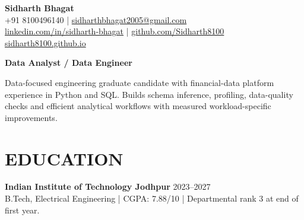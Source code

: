 \documentclass[10pt,a4paper]{article}
\begin{document}
\fontsize{9}{12.2}\selectfont
\begin{center}
{\fontsize{23}{26}\selectfont\bfseries Sidharth Bhagat}\\[4pt]
+91 8100496140 | \href{mailto:sidharthbhagat2005@gmail.com}{sidharthbhagat2005@gmail.com}\\
\href{https://www.linkedin.com/in/sidharth-bhagat/}{linkedin.com/in/sidharth-bhagat} | \href{https://github.com/Sidharth8100}{github.com/Sidharth8100}\\
\href{https://sidharth8100.github.io}{sidharth8100.github.io}
\end{center}
\textbf{Data Analyst / Data Engineer}\par
Data-focused engineering graduate candidate with financial-data platform experience in Python and SQL. Builds schema inference, profiling, data-quality checks and efficient analytical workflows with measured workload-specific improvements.
\section*{EDUCATION}
\textbf{Indian Institute of Technology Jodhpur} \hfill 2023--2027\\
B.Tech, Electrical Engineering | CGPA: 7.88/10 | Departmental rank 3 at end of first year.
\end{document}
